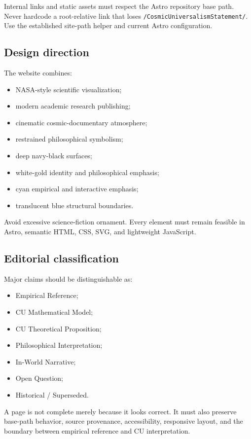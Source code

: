 \documentclass[11pt,letterpaper]{article}
\newcommand{\filepath}[1]{\nolinkurl{#1}}
\begin{document}
Internal links and static assets must respect the Astro repository base path.
Never hardcode a root-relative link that loses
\filepath{/CosmicUniversalismStatement/}. Use the established site-path helper
and current Astro configuration.

\subsection{Design direction}

The website combines:

\begin{itemize}
    \item NASA-style scientific visualization;
    \item modern academic research publishing;
    \item cinematic cosmic-documentary atmosphere;
    \item restrained philosophical symbolism;
    \item deep navy-black surfaces;
    \item white-gold identity and philosophical emphasis;
    \item cyan empirical and interactive emphasis;
    \item translucent blue structural boundaries.
\end{itemize}

Avoid excessive science-fiction ornament. Every element must remain feasible in
Astro, semantic HTML, CSS, SVG, and lightweight JavaScript.

\subsection{Editorial classification}

Major claims should be distinguishable as:

\begin{itemize}
    \item Empirical Reference;
    \item CU Mathematical Model;
    \item CU Theoretical Proposition;
    \item Philosophical Interpretation;
    \item In-World Narrative;
    \item Open Question;
    \item Historical / Superseded.
\end{itemize}

\begin{checkpointbox}
A page is not complete merely because it looks correct. It must also preserve
base-path behavior, source provenance, accessibility, responsive layout, and
the boundary between empirical reference and CU interpretation.
\end{checkpointbox}
\end{document}
